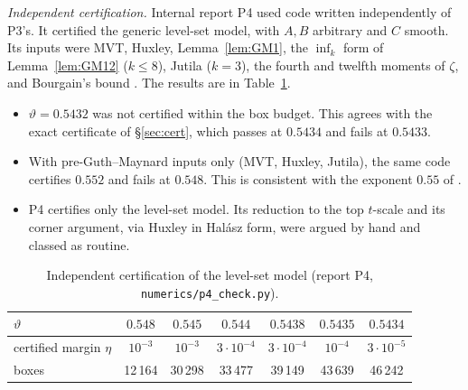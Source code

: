\documentclass[11pt]{amsart}
\theoremstyle{definition}
\theoremstyle{remark}
\begin{document}
\emph{Independent certification.} Internal report P4 used code written independently of P3's. It certified the generic level-set model, with $A,B$ arbitrary
and $C$ smooth. Its inputs were MVT, Huxley, Lemma~\ref{lem:GM1}, the $\inf_k$ form of Lemma~\ref{lem:GM12} ($k\le8$), Jutila ($k=3$),
the fourth and twelfth \cite{HB} moments of $\zeta$, and Bourgain's bound \cite{Bo}. The results are in Table~\ref{tab:p4}.
\begin{itemize}[leftmargin=*]
\item $\vartheta=0.5432$ was not certified within the box budget. This agrees with the exact certificate of \S\ref{sec:cert}, which passes at $0.5434$ and fails at $0.5433$.
\item With pre-Guth--Maynard inputs only (MVT, Huxley, Jutila), the same code certifies $0.552$ and fails at $0.548$. This is consistent with the exponent
$0.55$ of \cite{MT}.
\item P4 certifies only the level-set model. Its reduction to the top $t$-scale and its corner argument, via Huxley in Hal\'asz form, were argued by hand and
classed as routine.
\end{itemize}

\begin{table}[h]
\centering
\begin{tabular}{@{}lcccccc@{}}
\toprule
$\vartheta$ & $0.548$ & $0.545$ & $0.544$ & $0.5438$ & $0.5435$ & $0.5434$\\
\midrule
certified margin $\eta$ & $10^{-3}$ & $10^{-3}$ & $3\cdot10^{-4}$ & $3\cdot10^{-4}$ & $10^{-4}$ & $3\cdot10^{-5}$\\
boxes & 12\,164 & 30\,298 & 33\,477 & 39\,149 & 43\,639 & 46\,242\\
\bottomrule
\end{tabular}
\caption{Independent certification of the level-set model (report P4, \texttt{numerics/p4\_check.py}).}\label{tab:p4}
\end{table}
\end{document}
